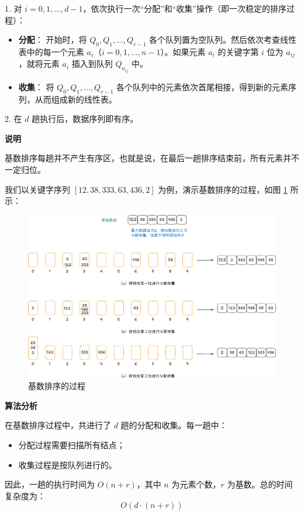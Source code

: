 \documentclass[lang=cn,newtx,10pt,scheme=chinese]{../elegantbook}
\begin{document}
1. 对 $i = 0, 1, \dots, d-1$，依次执行一次“分配”和“收集”操作（即一次稳定的排序过程）：
   \begin{itemize}
     \item \textbf{分配}：  
       开始时，将 $Q_0, Q_1, \dots, Q_{r-1}$ 各个队列置为空队列。然后依次考查线性表中的每一个元素 $a_i$（$i = 0, 1, \dots, n-1$）。如果元素 $a_i$ 的关键字第 $i$ 位为 $a_{ij}$，就将元素 $a_i$ 插入到队列 $Q_{a_{ij}}$ 中。
     \item \textbf{收集}：  
       将 $Q_0, Q_1, \dots, Q_{r-1}$ 各个队列中的元素依次首尾相接，得到新的元素序列，从而组成新的线性表。
   \end{itemize}

2. 在 $d$ 趟执行后，数据序列即有序。



\textbf{说明}  

基数排序每趟并不产生有序区，也就是说，在最后一趟排序结束前，所有元素并不一定归位。

我们以关键字序列 $[12,38,333,63,436,2]$ 为例，演示基数排序的过程，如图 \ref{fig:radixSort} 所示：

\begin{figure}[!htbp]
    \centering
    \includegraphics[width=1\textwidth]{./figure/pdf/cropped/radixSort.pdf}
    \caption{基数排序的过程}
    \label{fig:radixSort}
\end{figure}

\textbf{算法分析}

在基数排序过程中，共进行了 $d$ 趟的分配和收集。每一趟中：
\begin{itemize}
  \item 分配过程需要扫描所有结点；
  \item 收集过程是按队列进行的。
\end{itemize}
因此，一趟的执行时间为 $O(n + r)$，其中 $n$ 为元素个数，$r$ 为基数。总的时间复杂度为：
\[
O(d \cdot (n + r))
\]
\end{document}
